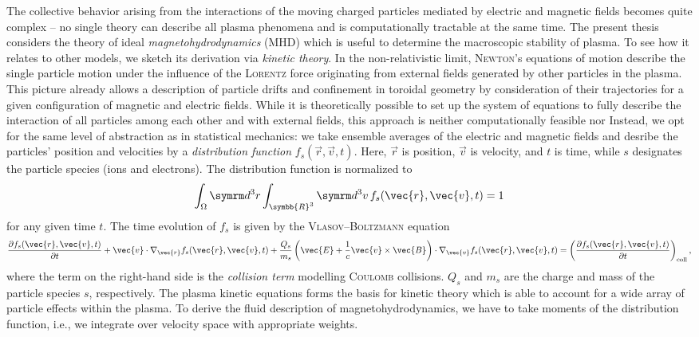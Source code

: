 The collective behavior arising from the interactions of the moving charged particles mediated by electric and magnetic fields becomes quite complex -- no single theory can describe all plasma phenomena and is computationally tractable at the same time. The present thesis considers the theory of ideal \emph{magnetohydrodynamics} (MHD) which is useful to determine the macroscopic stability of plasma. To see how it relates to other models, we sketch its derivation via \emph{kinetic theory}. In the non-relativistic limit, \textsc{Newton}'s equations of motion describe the single particle motion under the influence of the \textsc{Lorentz} force originating from external fields generated by other particles in the plasma. This picture already allows a description of particle drifts and confinement in toroidal geometry by consideration of their trajectories for a given configuration of magnetic and electric fields. While it is theoretically possible to set up the system of equations to fully describe the interaction of all particles among each other and with external fields, this approach is neither computationally feasible nor  Instead, we opt for the same level of abstraction as in statistical mechanics: we take ensemble averages of the electric and magnetic fields and desribe the particles' position and velocities by a \emph{distribution function} $f_{s} (\vec{r}, \vec{v}, t)$. Here, $\vec{r}$ is position, $\vec{v}$ is velocity, and $t$ is time, while $s$ designates the particle species (ions and electrons). The distribution function is normalized to
\begin{gather}
  \int_{\Omega} \diff^{3} r \int_{\symbb{R}^{3}} \diff^{3} v \, f_{s} (\vec{r}, \vec{v}, t) = 1
\end{gather}
for any given time $t$. The time evolution of $f_{s}$ is given by the \textsc{Vlasov}--\textsc{Boltzmann} equation
\begin{gather}
  \pd[f_{s} (\vec{r}, \vec{v}, t)]{t} + \vec{v} \cdot \grad_{\vec{r}} f_{s} (\vec{r}, \vec{v}, t) + \frac{Q_{s}}{m_{s}} \left ( \vec{E} + \frac{1}{c} \vec{v} \times \vec{B} \right ) \cdot \grad_{\vec{v}} f_{s} (\vec{r}, \vec{v}, t) = \left ( \pd[f_{s} (\vec{r}, \vec{v}, t)]{t} \right )_{\text{coll}},
\end{gather}
where the term on the right-hand side is the \emph{collision term} modelling \textsc{Coulomb} collisions. $Q_{s}$ and $m_{s}$ are the charge and mass of the particle species $s$, respectively. The plasma kinetic equations forms the basis for kinetic theory which is able to account for a wide array of particle effects within the plasma. To derive the fluid description of magnetohydrodynamics, we have to take moments of the distribution function, i.e., we integrate over velocity space with appropriate weights.

